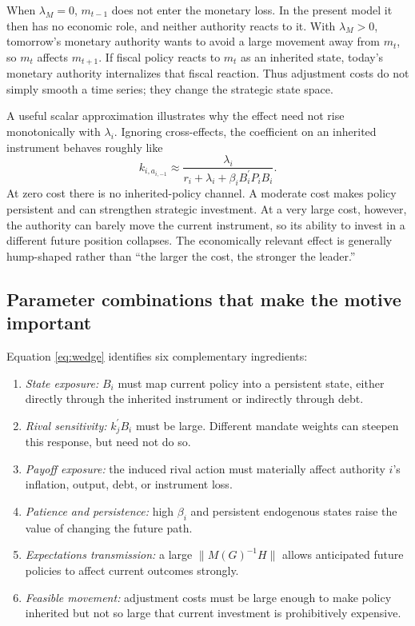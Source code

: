 \documentclass[11pt]{article}
\newcommand{\trans}{^{\prime}}
\begin{document}
When $\lambda_M=0$, $m_{t-1}$ does not enter the monetary loss. In the present
model it then has no economic role, and neither authority reacts to it. With
$\lambda_M>0$, tomorrow's monetary authority wants to avoid a large movement
away from $m_t$, so $m_t$ affects $m_{t+1}$. If fiscal policy reacts to
$m_t$ as an inherited state, today's monetary authority internalizes that
fiscal reaction. Thus adjustment costs do not simply smooth a time series;
they change the strategic state space.

A useful scalar approximation illustrates why the effect need not rise
monotonically with $\lambda_i$. Ignoring cross-effects, the coefficient on an
inherited instrument behaves roughly like
\begin{equation}
k_{i,a_{i,-1}}\approx
\frac{\lambda_i}{r_i+\lambda_i+\beta_i B_i\trans P_iB_i}.
\label{eq:persistenceapprox}
\end{equation}
At zero cost there is no inherited-policy channel. A moderate cost makes
policy persistent and can strengthen strategic investment. At a very large
cost, however, the authority can barely move the current instrument, so its
ability to invest in a different future position collapses. The economically
relevant effect is generally hump-shaped rather than ``the larger the cost,
the stronger the leader.''

\subsection{Parameter combinations that make the motive important}

Equation \eqref{eq:wedge} identifies six complementary ingredients:

\begin{enumerate}
  \item \textit{State exposure:} $B_i$ must map current policy into a
        persistent state, either directly through the inherited instrument or
        indirectly through debt.
  \item \textit{Rival sensitivity:} $k_j\trans B_i$ must be large. Different
        mandate weights can steepen this response, but need not do so.
  \item \textit{Payoff exposure:} the induced rival action must materially
        affect authority $i$'s inflation, output, debt, or instrument loss.
  \item \textit{Patience and persistence:} high $\beta_i$ and persistent
        endogenous states raise the value of changing the future path.
  \item \textit{Expectations transmission:} a large
        $\lVert M(G)^{-1}H\rVert$ allows anticipated future policies to affect
        current outcomes strongly.
  \item \textit{Feasible movement:} adjustment costs must be large enough to
        make policy inherited but not so large that current investment is
        prohibitively expensive.
\end{enumerate}
\end{document}
